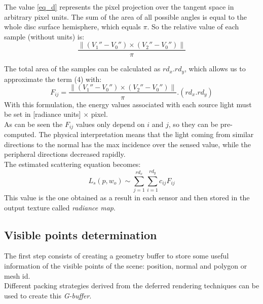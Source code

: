 \documentclass[10pt, conference]{IEEEtran}
\begin{document}
The value \ref{eq_d} represents the pixel projection over the tangent space in arbitrary pixel units. The sum of the area of all possible angles is equal to the whole disc surface hemisphere, which equals $\pi$. So the relative value of each sample (without units) is:\\
\[ 
	\frac{ \left\|{ (V_1'' - V_0'') \times (V_2'' - V_0'') }\right\| }{\pi}
\]

The total area of the samples can be calculated as $rd_x . rd_y$, which allows us to approximate the term (4) with:\\
\[ 
	F_{ij} =  \frac{ \left\|{ (V_1'' - V_0'') \times (V_2'' - V_0'') }\right\| }{\pi} . (rd_x . rd_y)
\]
With this formulation, the energy values associated with each source light must be set in [radiance units] $\times$ pixel.\\

As can be seen the $F_{ij}$ values only depend on $i$ and $j$, so they can be pre-computed. The physical interpretation means that the light 
coming from similar directions to the normal has the max incidence over the sensed value, while the peripheral directions decreased rapidly.\\

The estimated scattering equation becomes:\\
\[
	L_s(p, w_o) \sim \sum_{j=1}^{rd_x} \sum_{i=1}^{rd_y} c_{ij} F_{ij}
\]
This value is the one obtained as a result in each sensor and then stored in the output texture called \emph{radiance map}.

\subsection{Visible points determination}
The first step consists of creating a geometry buffer to store some useful information of the visible points of the scene: position, normal and polygon or mesh id.\\
Different packing strategies derived from the deferred rendering techniques \cite{deferred_rendering} can be used to create this \emph{G-buffer}. 

\end{document}
